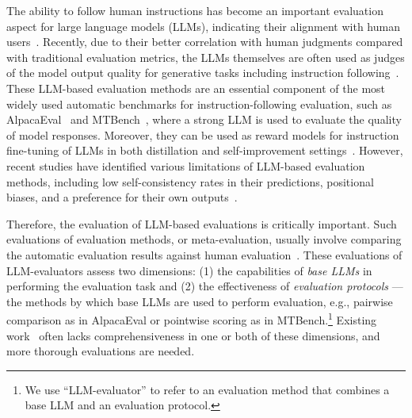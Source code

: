\documentclass[11pt]{article}
\begin{document}
% 
The ability to follow human instructions has become an important evaluation aspect for large language models (LLMs), indicating their alignment with human users~\cite{NEURIPS2022_b1efde53}.
Recently, due to their better correlation with human judgments compared with traditional evaluation metrics, the LLMs themselves are often used as judges of the model output quality for generative tasks including instruction following~\cite{liu-etal-2023-g, fu2023gptscore, zheng2024judging}.
% 
These LLM-based evaluation methods are an essential component of the most widely used automatic benchmarks for instruction-following evaluation, such as AlpacaEval~\cite{alpaca_eval} and MTBench~\cite{zheng2024judging}, where a strong LLM is used to evaluate the quality of model responses.
% 
Moreover, they can be used as reward models for instruction fine-tuning of LLMs in both distillation and self-improvement settings~\citep{tunstall2023zephyr, yuan2024selfrewarding}.
However, recent studies have identified various limitations of LLM-based evaluation methods, including low self-consistency rates in their predictions, positional biases, and a preference for their own outputs~\cite{liu-etal-2023-g,wang-etal-2024-large-language-models-fair, zheng2024judging, panickssery2024llm}.
% 

%


Therefore, the evaluation of LLM-based evaluations is critically important.
% 
Such evaluations of evaluation methods, or meta-evaluation, usually involve comparing the automatic evaluation results against human evaluation~\cite{liu-etal-2023-g, dubois2024alpacafarm, zeng2024evaluating}.
These evaluations of LLM-evaluators assess two dimensions: (1) the capabilities of \textit{base LLMs} in performing the evaluation task and (2) the effectiveness of \textit{evaluation protocols} — the methods by which base LLMs are used to perform evaluation, e.g., pairwise comparison as in AlpacaEval or pointwise scoring as in MTBench.\footnote{We use ``LLM-evaluator'' to refer to an evaluation method that combines a base LLM and an evaluation protocol.}
Existing work~\cite{zheng2024judging, wang-etal-2024-large-language-models-fair, zeng2024evaluating} often lacks comprehensiveness in one or both of these dimensions, and more thorough evaluations are needed.


%
\end{document}
